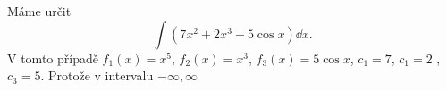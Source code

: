 \begin{mdframed}[style=mdexam]
  \begin{example}\label{MAI:exam142}
    Máme určit 
    \begin{equation*}
      \int(7x^2+2x^3+5\cos x)\dd{x}.
    \end{equation*} 
    V tomto případě \(f_1(x) = x^5\), \(f_2(x) = x^3\), \(f_3(x) = 5\cos x\), \(c_1=7\), \(c_1=2\) ,
    \(c_3=5\). Protože v intervalu \(-\infty, \infty\)
  \end{example}
\end{mdframed}